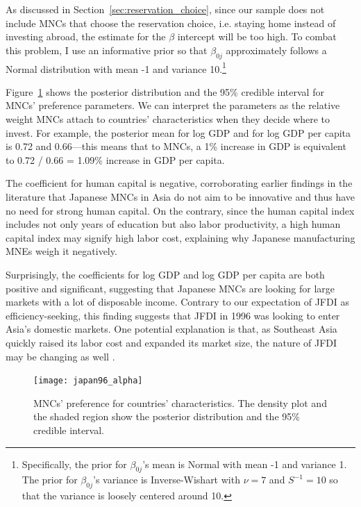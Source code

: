 As discussed in Section~\ref{sec:reservation_choice}, since our sample does not
include MNCs that choose the reservation choice, i.e. staying home instead of
investing abroad, the estimate for the $\beta$ intercept will be too high. To
combat this problem, I use an informative prior so that $\beta_{0j}$
approximately follows a Normal distribution with mean -1 and variance
10.\footnote{Specifically, the prior for $\beta_{0j}$'s mean is Normal with mean
  -1 and variance 1. The prior for $\beta_{0j}$'s variance is Inverse-Wishart
  with $\nu = 7$ and $S^{-1} = 10$ so that the variance is loosely centered
  around 10.}

Figure~\ref{fig:japan96_alpha} shows the posterior distribution and the 95\%
credible interval for MNCs' preference parameters. We can interpret the
parameters as the relative weight MNCs attach to countries' characteristics when
they decide where to invest. For example, the posterior mean for log GDP and for
log GDP per capita is 0.72 and 0.66---this means that to MNCs, a 1\% increase in
GDP is equivalent to 0.72 / 0.66 = 1.09\% increase in GDP per capita.

The coefficient for human capital
is negative, corroborating earlier findings in the literature that Japanese MNCs
in Asia do not aim to be innovative and thus have no need for strong human
capital. On the contrary, since the human capital index includes not only years
of education but also labor productivity, a high human capital index may signify
high labor cost, explaining why Japanese manufacturing MNEs weigh it negatively.

Surprisingly, the coefficients for log GDP and log GDP per capita are both positive and
significant, suggesting that Japanese MNCs are looking for large markets with a
lot of disposable income. Contrary to our expectation of JFDI as
efficiency-seeking, this finding suggests that JFDI in 1996 was looking to enter
Asia's domestic markets. One potential explanation is that, as Southeast Asia
quickly raised its labor cost and expanded its market size, the nature of JFDI
may be changing as well \citep[44]{Jomo2003}.

\begin{figure}[tbp] \centering
  \texttt{[image: japan96\_alpha]}
  \caption[MNCs' preference for countries' characteristics.]{MNCs' preference
    for countries' characteristics. The density plot and the shaded region show
    the posterior distribution and the 95\% credible interval.}
  \label{fig:japan96_alpha}
\end{figure}

